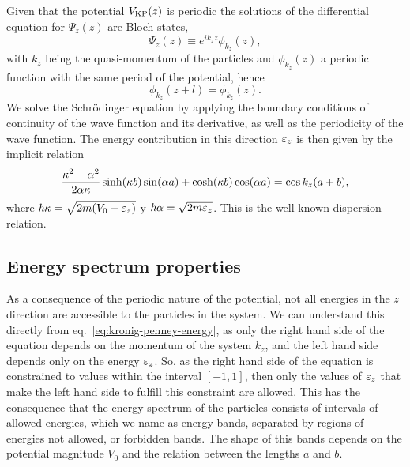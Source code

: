 Given that the {\KP} potential $V_{\mathrm{KP}}(z)$ is periodic the solutions of the
differential equation for $\Psi_z(z)$ are Bloch states,
%
\begin{equation}
  \label{eq:bloch-wave}
  \Psi_z(z) \equiv e^{i k_z z} \phi_{k_z}(z),
\end{equation}
%
with $k_z$ being the quasi-momentum of the particles and $\phi_{k_z}(z)$ a
periodic function with the same period of the potential, hence
%
\begin{equation}
  \phi_{k_z}(z + l) = \phi_{k_z}(z).
\end{equation}
%
We solve the Schrödinger equation by applying the boundary conditions of
continuity of the wave function and its derivative, as well as the periodicity
of the wave function. The energy contribution in this direction ${\varepsilon}_{z}$ is then
given by the implicit relation~\cite{bib:kronig-proc-roy-soc-lond.130.1931}
%
\begin{equation}
  \label{eq:kronig-penney-energy}
  \frac{\kappa^2 - \alpha^2}{2 \alpha \kappa} \sinh(\kappa b) \sin(\alpha a) + \cosh(\kappa b) \cos(\alpha a) = \cos k_{z}(a+b),
\end{equation}
%
where $\hbar\kappa = \sqrt{2m({V_0} - {\varepsilon}_{z})}$ y $\hbar \alpha = \sqrt{2m{\varepsilon}_{z}}$.
This is the well-known {\KP} dispersion relation.


\subsection{Energy spectrum properties}

As a consequence of the periodic nature of the potential, not all energies in
the $z$ direction are accessible to the particles in the system. We can
understand this directly from eq.~\eqref{eq:kronig-penney-energy}, as only the
right hand side of the equation depends on the momentum of the system $k_z$, and
the left hand side depends only on the energy ${\varepsilon}_{z}$. So, as the right hand side
of the equation is constrained to values within the interval $[-1, 1]$, then
only the values of ${\varepsilon}_{z}$ that make the left hand side to fulfill this constraint
are allowed. This has the consequence that the energy spectrum of the particles
consists of intervals of allowed energies, which we name as energy bands,
separated by regions of energies not allowed, or forbidden bands. The shape of
this bands depends on the potential magnitude $V_0$ and the relation between the
lengths $a$ and $b$.

